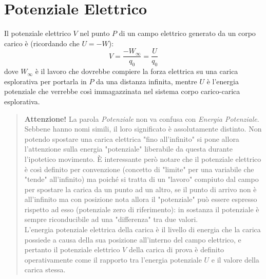         \section{Potenziale Elettrico} Il potenziale elettrico $V$ nel punto 
        $P$ di un campo elettrico generato da un corpo carico è (ricordando che
        $U = -W$):
            \begin{equation}
                V = \frac{-W_\infty}{q_0} = \frac{U}{q_0}
            \end{equation}
        dove $W_\infty$ è il lavoro che dovrebbe compiere la forza elettrica su
        una carica esplorativa per portarla in $P$ da una distanza infinita, 
        mentre $U$ è l'energia potenziale che verrebbe così immagazzinata nel
        sistema corpo carico-carica esplorativa.
            \begin{quote}
                \textbf{Attenzione!} La parola \textit{Potenziale} non va 
                confusa con \textit{Energia Potenziale}. Sebbene hanno nomi 
                simili, il loro significato è assolutamente distinto.
                Non potendo spostare una carica elettrica "fino all'infinito" 
                si pone allora l'attenzione sulla energia "potenziale" 
                liberabile da questa durante l'ipotetico movimento. È 
                interessante però notare che il potenziale elettrico è così 
                definito per convenzione (concetto di "limite" per una 
                variabile che "tende" all'infinito) ma poiché si tratta di un 
                "lavoro" compiuto dal campo per spostare la carica da un punto 
                ad un altro, se il punto di arrivo non è all'infinito ma con 
                posizione nota allora il "potenziale" può essere espresso 
                rispetto ad esso (potenziale zero di riferimento): in sostanza 
                il potenziale è sempre riconducibile ad una "differenza" tra 
                due valori.\\
                L'energia potenziale elettrica della carica è il livello di 
                energia che la carica possiede a causa della sua posizione 
                all'interno del campo elettrico, e pertanto il potenziale 
                elettrico $V$ della carica di prova è definito operativamente 
                come il rapporto tra l'energia potenziale $U$ e il valore della
                carica stessa.
            \end{quote}

